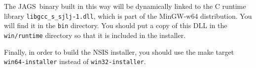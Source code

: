 \documentclass[11pt, a4paper, titlepage]{article}
\newcommand{\JAGS}{\textsf{JAGS}}
\begin{document}
The \JAGS\ binary built in this way will be dynamically linked to the
C runtime library \verb+libgcc_s_sjlj-1.dll+, which is part of the
MinGW-w64 distribution. You will find it in the \texttt{bin}
directory. You should put a copy of this DLL in the
\texttt{win/runtime} directory so that it is included in the
installer.

Finally, in order to build the NSIS installer, you should use the make
target \verb+win64-installer+ instead of \verb+win32-installer+.
\end{document}
